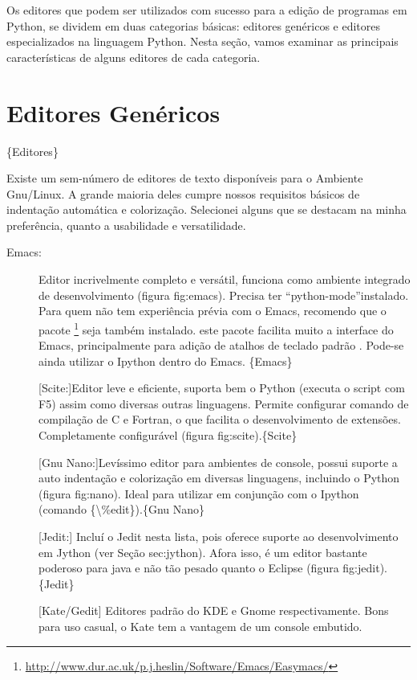 \documentclass[a4paper,10pt,brazil]{sphinxmanual}
\begin{document}
Os editores que podem ser utilizados com sucesso para a edição de
programas em Python, se dividem em duas categorias básicas:
editores genéricos e editores especializados na linguagem Python.
Nesta seção, vamos examinar as principais características de alguns
editores de cada categoria.


\chapter{Editores Genéricos}
\label{capferr::doc}\label{capferr:editores-genericos}
\{Editores\}

Existe um sem-número de editores de texto disponíveis para o
Ambiente Gnu/Linux. A grande maioria deles cumpre nossos requisitos
básicos de indentação automática e colorização. Selecionei alguns
que se destacam na minha preferência, quanto a usabilidade e
versatilidade.
\begin{description}
\item[{Emacs:}] \leavevmode
Editor incrivelmente completo e versátil, funciona como ambiente
integrado de desenvolvimento (figura fig:emacs). Precisa ter
``python-mode''instalado. Para quem não tem experiência prévia com o
Emacs, recomendo que o pacote  \footnote{
\href{http://www.dur.ac.uk/p.j.heslin/Software/Emacs/Easymacs/}{http://www.dur.ac.uk/p.j.heslin/Software/Emacs/Easymacs/}
} seja também
instalado. este pacote facilita muito a interface do Emacs,
principalmente para adição de atalhos de teclado padrão .
Pode-se ainda utilizar o Ipython dentro do Emacs. \{Emacs\}

{[}Scite:{]}Editor leve e eficiente, suporta bem o Python (executa o
script com F5) assim como diversas outras linguagens. Permite
configurar comando de compilação de C e Fortran, o que facilita o
desenvolvimento de extensões. Completamente configurável (figura
fig:scite).\{Scite\}

{[}Gnu Nano:{]}Levíssimo editor para ambientes de console, possui
suporte a auto indentação e colorização em diversas linguagens,
incluindo o Python (figura fig:nano). Ideal para utilizar em
conjunção com o Ipython (comando \{\textbackslash{}\%edit\}).\{Gnu Nano\}

{[}Jedit:{]} Incluí o Jedit nesta lista, pois oferece suporte ao
desenvolvimento em Jython (ver Seção sec:jython). Afora isso, é um
editor bastante poderoso para java e não tão pesado quanto o
Eclipse (figura fig:jedit).\{Jedit\}

{[}Kate/Gedit{]} Editores padrão do KDE e Gnome respectivamente. Bons
para uso casual, o Kate tem a vantagem de um console embutido.

\end{description}
\end{document}
